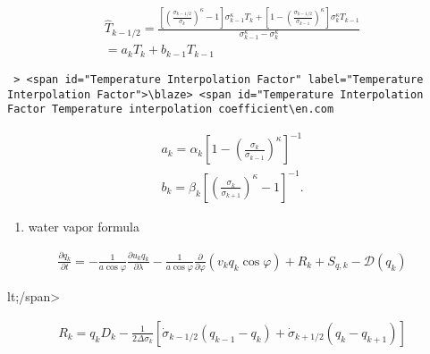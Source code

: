 \begin{eqnarray}
  \hat{T}_{k-1/2}
   =  \frac{ \left[ \left( \frac{ \sigma_{k-1/2} }
                               { \sigma_k } \right)^{\kappa}
                  - 1 \right] \sigma_{k-1}^{\kappa} T_k 
          + \left[ 1- 
                   \left( \frac{ \sigma_{k-1/2} }
                               { \sigma_{k-1} } \right)^{\kappa}
                      \right] \sigma_k^{\kappa} T_{k-1}         }
          { \sigma_{k-1}^{\kappa} - \sigma_k^{\kappa}           } \\
   =  a_k T_k + b_{k-1} T_{k-1}
\end{eqnarray}

\begin{verbatim}
 > <span id="Temperature Interpolation Factor" label="Temperature Interpolation Factor">\blaze> <span id="Temperature Interpolation Factor Temperature interpolation coefficient\en.com
\end{verbatim}

\begin{eqnarray}
  a_k  =  \alpha_k 
              \left[ 1- \left( \frac{ \sigma_k }{ \sigma_{k-1} }
                        \right)^{\kappa} \right]^{-1}   \\
  b_k  =  \beta_k 
              \left[ \left( \frac{ \sigma_k }{ \sigma_{k+1} } 
                     \right)^{\kappa} - 1 \right]^{-1} .  
\end{eqnarray}

\begin{enumerate}
\def\labelenumi{\arabic{enumi}.}
\setcounter{enumi}{4}
\tightlist
\item
  water vapor formula
\end{enumerate}

\begin{eqnarray}
  \frac{\partial q_k}{\partial t}
      =   - \frac{1}{a\cos\varphi} 
               \frac{\partial u_k q_k}{\partial \lambda}
          - \frac{1}{a\cos\varphi}
               \frac{\partial }{\partial \varphi} ( v_k q_k\cos\varphi)
          + R_k 
          + S_{q,k}
          - {\mathcal D}(q_k) 
\end{eqnarray}

lt;/span\textgreater{}

\begin{eqnarray}
R_k  =  q_k D_k 
       - \frac{1}{2 \Delta \sigma_k} 
             [   \dot{\sigma}_{k-1/2} ( q_{k-1} - q_k   )
               + \dot{\sigma}_{k+1/2} ( q_k   - q_{k+1} ) ]
\end{eqnarray}
